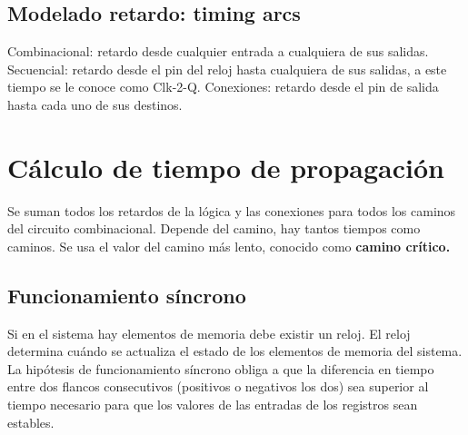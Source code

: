 \subsection{Modelado retardo: timing arcs}
Combinacional: retardo desde cualquier entrada a cualquiera de sus salidas. Secuencial: retardo desde el pin del reloj hasta cualquiera de sus salidas, a este tiempo se le conoce como Clk-2-Q. Conexiones: retardo desde el pin de salida hasta cada uno de sus destinos.
\section{Cálculo de tiempo de propagación}
Se suman todos los retardos de la lógica y las conexiones para todos los caminos del circuito  combinacional. Depende del camino, hay tantos tiempos como caminos. Se usa el valor del camino más lento, conocido como \textbf{camino crítico.}
\subsection{Funcionamiento síncrono}
Si en el sistema hay elementos de memoria debe existir un reloj. El reloj determina cuándo se actualiza el estado de los elementos de memoria del sistema.\\
La hipótesis de funcionamiento síncrono obliga a que la diferencia en tiempo entre dos flancos consecutivos (positivos o negativos los dos) sea superior al tiempo necesario para que los valores de las entradas de los registros sean estables.
